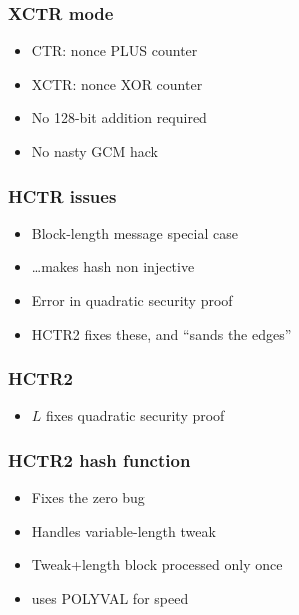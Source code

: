 \documentclass{beamer}
\begin{document}
\begin{frame}

    \frametitle{XCTR mode}
    
    \begin{itemize}
        \item CTR: nonce PLUS counter
        \item XCTR: nonce XOR counter
        \item No 128-bit addition required
        \item No nasty GCM hack
    \end{itemize}
\end{frame}

\begin{frame}

\frametitle{HCTR issues}

\begin{itemize}
    \item Block-length message special case
    \item \ldots makes hash non injective
    \item Error in quadratic security proof
    \item HCTR2 fixes these, and ``sands the edges''
\end{itemize}
\end{frame}

\begin{frame}

\frametitle{HCTR2}
\begin{figure}

\end{figure}
\begin{itemize}
    \item $L$ fixes quadratic security proof
\end{itemize}

\end{frame}

\begin{frame}

\frametitle{HCTR2 hash function}

\begin{itemize}
    \item Fixes the zero bug
    \item Handles variable-length tweak
    \item Tweak+length block processed only once
    \item uses POLYVAL for speed
\end{itemize}
\end{frame}
\end{document}

